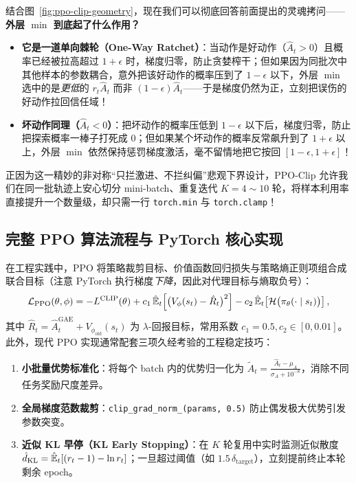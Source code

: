 结合图~\ref{fig:ppo-clip-geometry}，现在我们可以彻底回答前面提出的灵魂拷问——\textbf{外层 $\min$ 到底起了什么作用？}
\begin{itemize}
  \item \textbf{它是一道单向棘轮（One-Way Ratchet）}：当动作是好动作（$\hat{A}_t > 0$）且概率已经被拉高超过 $1+\epsilon$ 时，梯度归零，防止贪婪榨干；但如果因为同批次中其他样本的参数耦合，意外把该好动作的概率压到了 $1-\epsilon$ 以下，外层 $\min$ 选中的是\emph{更低}的 $r_t \hat{A}_t$ 而非 $(1-\epsilon)\hat{A}_t$——于是梯度仍然为正，立刻把误伤的好动作拉回信任域！
  \item \textbf{坏动作同理（$\hat{A}_t < 0$）}：把坏动作的概率压低到 $1-\epsilon$ 以下后，梯度归零，防止把探索概率一棒子打死成 $0$；但如果某个坏动作的概率反常飙升到了 $1+\epsilon$ 以上，外层 $\min$ 依然保持惩罚梯度激活，毫不留情地把它按回 $[1-\epsilon, 1+\epsilon]$！
\end{itemize}
正因为这一精妙的非对称“只拦激进、不拦纠偏”悲观下界设计，PPO-Clip 允许我们在同一批轨迹上安心切分 mini-batch、重复迭代 $K = 4 \sim 10$ 轮，将样本利用率直接提升一个数量级，却只需一行 \texttt{torch.min} 与 \texttt{torch.clamp}！

\subsection{完整 PPO 算法流程与 PyTorch 核心实现}

在工程实践中，PPO 将策略裁剪目标、价值函数回归损失与策略熵正则项组合成联合目标（注意 PyTorch 执行梯度\emph{下降}，因此对代理目标与熵取负号）：
\begin{equation}
  \mathcal{L}_{\mathrm{PPO}}(\theta, \phi)
  = -L^{\mathrm{CLIP}}(\theta)
    + c_1\,\hat{\mathbb{E}}_t\!\left[\big(V_\phi(s_t) - \hat{R}_t\big)^2\right]
    - c_2\,\hat{\mathbb{E}}_t\!\left[\mathcal{H}\big(\pi_\theta(\cdot \mid s_t)\big)\right],
  \label{eq:ppo-total-loss}
\end{equation}
其中 $\hat{R}_t = \hat{A}_t^{\mathrm{GAE}} + V_{\phi_{\mathrm{old}}}(s_t)$ 为 $\lambda$-回报目标，常用系数 $c_1 = 0.5, c_2 \in [0, 0.01]$。此外，现代 PPO 实现通常配套三项久经考验的工程稳定技巧：
\begin{enumerate}
  \item \textbf{小批量优势标准化}：将每个 batch 内的优势归一化为 $\tilde{A}_t = \frac{\hat{A}_t - \mu_A}{\sigma_A + 10^{-8}}$，消除不同任务奖励尺度差异。
  \item \textbf{全局梯度范数裁剪}：\texttt{clip\_grad\_norm\_(params, 0.5)} 防止偶发极大优势引发参数突变。
  \item \textbf{近似 KL 早停（KL Early Stopping）}：在 $K$ 轮复用中实时监测近似散度 $\hat{d}_{\mathrm{KL}} = \hat{\mathbb{E}}_t[(r_t - 1) - \ln r_t]$；一旦超过阈值（如 $1.5\,\delta_{\mathrm{target}}$），立刻提前终止本轮剩余 epoch。
\end{enumerate}

